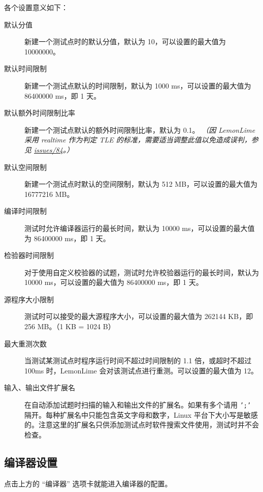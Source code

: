 \documentclass[UTF-8]{ctexart}
\begin{document}
				各个设置意义如下：

				\begin{description}
					\item[默认分值] 新建一个测试点时的默认分值，默认为 10，可以设置的最大值为 10000000。
					\item[默认时间限制] 新建一个测试点默认的时间限制，默认为 1000 ms，可以设置的最大值为 86400000 ms，即 1 天。
					\item[默认额外时间限制比率] 新建一个测试点默认的额外时间限制比率，默认为 0.1。 \emph{（因 LemonLime 采用 realtime 作为判定 TLE 的标准，需要适当调整此值以免造成误判，参见 \href{https://github.com/Project-LemonLime/Project_LemonLime/issues/84}{issues/84}。）}
					\item[默认空间限制] 新建一个测试点时默认的空间限制，默认为 512 MB，可以设置的最大值为 16777216 MB。
					\item[编译时间限制] 测试时允许编译器运行的最长时间，默认为 10000 ms，可以设置的最大值为 86400000 ms，即 1 天。
					\item[检验器时间限制] 对于使用自定义校验器的试题，测试时允许校验器运行的最长时间，默认为 10000 ms，可以设置的最大值为 86400000 ms，即 1 天。
					\item[源程序大小限制] 测试时可以接受的最大源程序大小，可以设置的最大值为 262144 KB，即 256 MB。（1 KB = 1024 B）
					\item[最大重测次数] 当测试某测试点时程序运行时间不超过时间限制的 1.1 倍，或超时不超过 100ms 时，LemonLime 会对该测试点进行重测。可以设置的最大值为 12。
					\item[输入、输出文件扩展名]  在自动添加试题时扫描的输入和输出文件的扩展名。如果有多个请用 \texttt{';'} 隔开。每种扩展名中只能包含英文字母和数字，Linux 平台下大小写是敏感的。注意这里的扩展名只供添加测试点时软件搜索文件使用，测试时并不会检查。
				\end{description}

			\subsection{编译器设置}

				点击上方的 “编译器” 选项卡就能进入编译器的配置。
\end{document}
